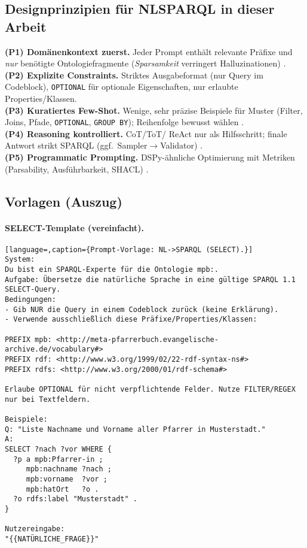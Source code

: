 \subsection{Designprinzipien für NL{\textrightarrow}SPARQL in dieser Arbeit}
\textbf{(P1) Domänenkontext zuerst.} Jeder Prompt enthält relevante Präfixe und \emph{nur} benötigte Ontologiefragmente (\emph{Sparsamkeit} verringert Halluzinationen) \cite{avila2024text2sparql}. \\
\textbf{(P2) Explizite Constraints.} Striktes Ausgabeformat (nur Query im Codeblock), \texttt{OPTIONAL} für optionale Eigenschaften, nur erlaubte Properties/Klassen. \\
\textbf{(P3) Kuratiertes Few-Shot.} Wenige, sehr präzise Beispiele für Muster (Filter, Joins, Pfade, \texttt{OPTIONAL}, \texttt{GROUP BY}); Reihenfolge bewusst wählen \cite{zhao2021calibrate}. \\
\textbf{(P4) Reasoning kontrolliert.} CoT/ToT/ ReAct nur als Hilfsschritt; finale Antwort strikt SPARQL (ggf.\ Sampler$\rightarrow$Validator) \cite{wei2022cot,wang2023selfconsistency,yao2022react}. \\
\textbf{(P5) Programmatic Prompting.} DSPy-ähnliche Optimierung mit Metriken (Parsability, Ausführbarkeit, SHACL) \cite{khattab2023dspy}.

\subsection{Vorlagen (Auszug)}
\paragraph{SELECT-Template (vereinfacht).}
\begin{lstlisting}[language=,caption={Prompt-Vorlage: NL->SPARQL (SELECT).}]
System:
Du bist ein SPARQL-Experte für die Ontologie mpb:.
Aufgabe: Übersetze die natürliche Sprache in eine gültige SPARQL 1.1 SELECT-Query.
Bedingungen:
- Gib NUR die Query in einem Codeblock zurück (keine Erklärung).
- Verwende ausschließlich diese Präfixe/Properties/Klassen:

PREFIX mpb: <http://meta-pfarrerbuch.evangelische-archive.de/vocabulary#>
PREFIX rdf: <http://www.w3.org/1999/02/22-rdf-syntax-ns#>
PREFIX rdfs: <http://www.w3.org/2000/01/rdf-schema#>

Erlaube OPTIONAL für nicht verpflichtende Felder. Nutze FILTER/REGEX nur bei Textfeldern.

Beispiele:
Q: "Liste Nachname und Vorname aller Pfarrer in Musterstadt."
A:
SELECT ?nach ?vor WHERE {
  ?p a mpb:Pfarrer-in ;
     mpb:nachname ?nach ;
     mpb:vorname  ?vor ;
     mpb:hatOrt   ?o .
  ?o rdfs:label "Musterstadt" .
}

Nutzereingabe:
"{{NATÜRLICHE_FRAGE}}"
\end{lstlisting}

